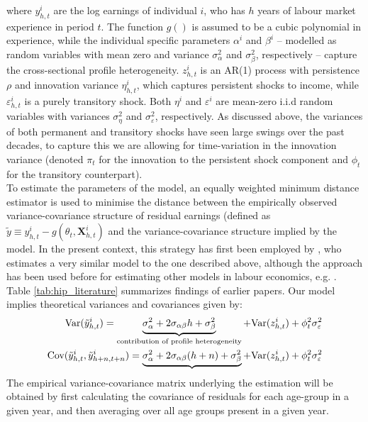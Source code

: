 where $y_{h,t}^i$ are the log earnings of individual $i$, who has $h$ years of
labour market experience in period $t$. The function $g()$ is assumed to be
a cubic polynomial in experience, while the individual specific parameters
$\alpha^i$ and $\beta^i$ -- modelled as random variables with mean zero and
variance $\sigma^2_{\alpha}$ and $\sigma^2_{\beta}$, respectively --
 capture the cross-sectional profile heterogeneity.
$z_{h,t}^i$ is an AR(1) process with persistence $\rho$ and innovation variance
$\eta_{h,t}^i$, which captures persistent shocks to income, while
$\varepsilon_{h,t}^i$ is a purely transitory shock. Both $\eta^i$ and
$\varepsilon^i$ are mean-zero i.i.d random variables with variances
$\sigma^2_{\eta}$ and $\sigma^2_{\varepsilon}$, respectively. As discussed
above, the variances of both permanent and transitory shocks have seen large
swings over the past decades, to capture this we are allowing for time-variation
in the innovation variance (denoted $\pi_t$ for the innovation to the persistent
shock component and $\phi_t$ for the transitory counterpart). \\
To estimate the parameters of the model, an equally weighted minimum distance
estimator is used to minimise the distance between the empirically observed
variance-covariance structure of residual earnings (defined as $\tilde{y} \equiv
y_{h,t}^i - g(\theta_t, \pmb{X}_{h,t}^i)$ and the variance-covariance
structure implied by the model. In the present context, this strategy has first
been employed by \citet{Baker1997}, who estimates a very similar model to the one
 described above, although the approach has been used before for estimating
other models in labour economics, e.g. \citet{AbowdCard89}. Table 
\ref{tab:hip_literature} summarizes findings of earlier papers. Our model implies
theoretical variances and covariances given by:
\begin{align}
\mbox{Var}(\tilde{y}_{h,t}^i) = \underbrace{\sigma^2_{\alpha} + 2 \sigma_{\alpha \beta} h + \sigma^2_{\beta}}_{\text{contribution of profile heterogeneity}} + \mbox{Var}(z^i_{h,t}) + \phi_t^2 \sigma^2_{\varepsilon} \\
\mbox{Cov}(\tilde{y}_{h,t}^i, \tilde{y}_{h+n,t+n}^i) = \underbrace{\sigma^2_{\alpha} + 2 \sigma_{\alpha \beta} (h+n) + \sigma^2_{\beta}} + \mbox{Var}(z^i_{h,t}) + \phi_t^2 \sigma^2_{\varepsilon}
\end{align}
The empirical variance-covariance matrix underlying the estimation will be
obtained by first calculating the covariance of residuals for each age-group
in a given year, and then averaging over all age groups present in a given year.
